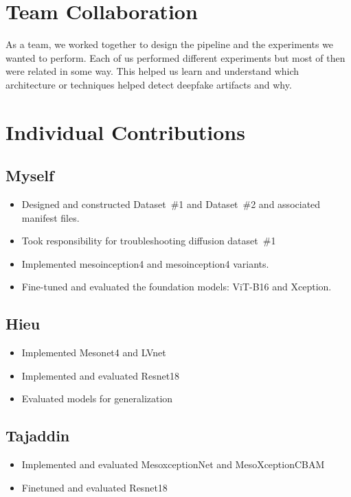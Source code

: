 \documentclass[conference]{IEEEtran}
\begin{document}
\section{Team Collaboration}
\label{sec:collaboration}

As a team, we worked together to design the pipeline and the experiments we wanted to perform. Each of us performed different experiments but most of then were related in some way. This helped us learn and understand which architecture or techniques helped detect deepfake artifacts and why.
\section{Individual Contributions}
\label{sec:contributions}
\subsection{Myself}
\begin{itemize}
  \item Designed and constructed Dataset~\#1 and Dataset~\#2 and associated manifest files.
  \item Took responsibility for troubleshooting diffusion dataset~\#1
  \item Implemented mesoinception4 and mesoinception4 variants.
  \item Fine-tuned and evaluated the foundation models: ViT-B16 and Xception.
\end{itemize}
\subsection{Hieu}
\begin{itemize}
  \item Implemented Mesonet4 and LVnet
  \item Implemented and evaluated Resnet18
  \item Evaluated models for generalization
\end{itemize}
\subsection{Tajaddin}
\begin{itemize}
  \item Implemented and evaluated MesoxceptionNet and MesoXceptionCBAM
  \item Finetuned and evaluated Resnet18
\end{itemize}
\end{document}
